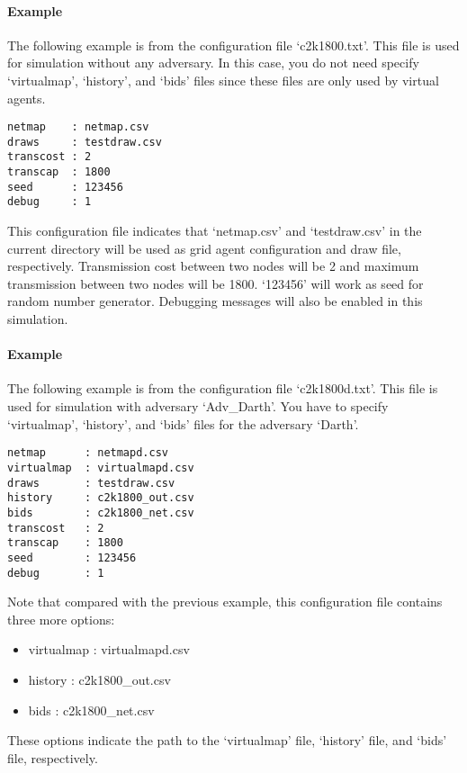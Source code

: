 \documentclass[12pt]{article}
\begin{document}
\bigskip
\noindent
\paragraph{Example}
The following example is from the configuration file `c2k1800.txt'.  
This file is used for simulation without any adversary. 
In this case, you do not need specify `virtualmap', `history', and `bids' files 
since these files are only used by virtual agents. 

\bigskip
\noindent
\begin{lstlisting}
netmap    : netmap.csv
draws     : testdraw.csv
transcost : 2
transcap  : 1800 
seed      : 123456
debug     : 1
\end{lstlisting}

\bigskip
\noindent
This configuration file indicates that `netmap.csv' and `testdraw.csv' in the current directory 
will be used as grid agent configuration and draw file, respectively. 
Transmission cost between two nodes will be 2 and maximum transmission between two nodes will be 1800. 
`123456' will work as seed for random number generator. 
Debugging messages will also be enabled in this simulation.  

\bigskip
\noindent
\paragraph{Example}
The following example is from the configuration file `c2k1800d.txt'. 
This file is used for simulation with adversary `Adv\_Darth'. 
You have to specify `virtualmap', `history', and `bids' files 
for the adversary `Darth'. 

\bigskip
\noindent
\begin{lstlisting}
netmap      : netmapd.csv
virtualmap  : virtualmapd.csv
draws       : testdraw.csv
history     : c2k1800_out.csv
bids        : c2k1800_net.csv
transcost   : 2
transcap    : 1800 
seed        : 123456
debug       : 1
\end{lstlisting}

\bigskip
\noindent
Note that compared with the previous example, this configuration file 
contains three more options: 
\begin{itemize}
    \item{virtualmap : virtualmapd.csv}
    \item{history    : c2k1800\_out.csv}    
    \item{bids       : c2k1800\_net.csv}
\end{itemize}
These options indicate the path to the `virtualmap' file, `history' file, 
and `bids' file, respectively.
\end{document}
